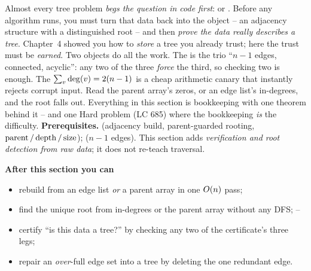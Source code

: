 \begin{topicintro}
Almost every tree problem \emph{begs the question in code first}: 
or . Before any algorithm runs, you must turn that data back into the
object -- an adjacency structure with a distinguished root -- and then \emph{prove the data really
describes a tree}. Chapter~4 showed you how to \emph{store} a tree you already trust; here the
trust must be \emph{earned}. Two objects do all the work. The  is the trio
``$n-1$ edges, connected, acyclic'': any two of the three \emph{force} the third, so checking two
is enough. The  $\sum_v\operatorname{deg}(v)=2(n-1)$ is a cheap arithmetic canary that
instantly rejects corrupt input. Read the parent array's zeros, or an edge list's in-degrees, and
the root falls out. Everything in this section is bookkeeping with one theorem behind it -- and one
Hard problem (LC 685) where the bookkeeping \emph{is} the difficulty.
\textbf{Prerequisites.}  (adjacency build, parent-guarded rooting,
$\operatorname{parent}/\operatorname{depth}/\operatorname{size}$);  ($n-1$ edges). This section adds \emph{verification and
root detection from raw data}; it does not re-teach traversal.

\textbf{After this section you can}
\begin{itemize}[nosep]
  \item rebuild  from an edge list \emph{or} a parent array in one $O(n)$ pass; \hfill{}
  \item find the unique root from in-degrees or the parent array without any DFS;          \hfill{}--
  \item certify ``is this data a tree?'' by checking any two of the certificate's three legs; \hfill{}
  \item repair an \emph{over}-full edge set into a tree by deleting the one redundant edge.  \hfill{}
\end{itemize}
\end{topicintro}

